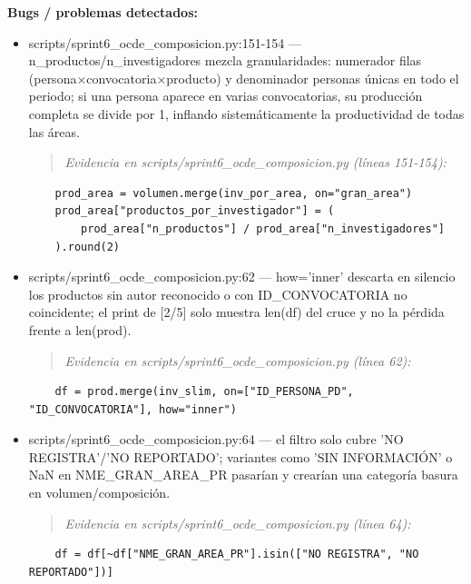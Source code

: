 \begin{tcolorbox}[riesgo]
\textbf{Bugs / problemas detectados:}
\begin{itemize}
  \item scripts/sprint6\_ocde\_composicion.py:151-154 --- n\_productos/n\_investigadores mezcla granularidades: numerador filas (persona$\times$convocatoria$\times$producto) y denominador personas únicas en todo el periodo; si una persona aparece en varias convocatorias, su producción completa se divide por 1, inflando sistemáticamente la productividad de todas las áreas.
\begin{quote}\footnotesize\ttfamily
\noindent\emph{Evidencia en scripts/sprint6\_ocde\_composicion.py (líneas 151-154):}
\end{quote}
\begin{lstlisting}
    prod_area = volumen.merge(inv_por_area, on="gran_area")
    prod_area["productos_por_investigador"] = (
        prod_area["n_productos"] / prod_area["n_investigadores"]
    ).round(2)
\end{lstlisting}

  \item scripts/sprint6\_ocde\_composicion.py:62 --- how='inner' descarta en silencio los productos sin autor reconocido o con ID\_CONVOCATORIA no coincidente; el print de [2/5] solo muestra len(df) del cruce y no la pérdida frente a len(prod).
\begin{quote}\footnotesize\ttfamily
\noindent\emph{Evidencia en scripts/sprint6\_ocde\_composicion.py (línea 62):}
\end{quote}
\begin{lstlisting}
    df = prod.merge(inv_slim, on=["ID_PERSONA_PD", "ID_CONVOCATORIA"], how="inner")
\end{lstlisting}

  \item scripts/sprint6\_ocde\_composicion.py:64 --- el filtro solo cubre 'NO REGISTRA'/'NO REPORTADO'; variantes como 'SIN INFORMACIÓN' o NaN en NME\_GRAN\_AREA\_PR pasarían y crearían una categoría basura en volumen/composición.
\begin{quote}\footnotesize\ttfamily
\noindent\emph{Evidencia en scripts/sprint6\_ocde\_composicion.py (línea 64):}
\end{quote}
\begin{lstlisting}
    df = df[~df["NME_GRAN_AREA_PR"].isin(["NO REGISTRA", "NO REPORTADO"])]
\end{lstlisting}

\end{itemize}
\end{tcolorbox}

